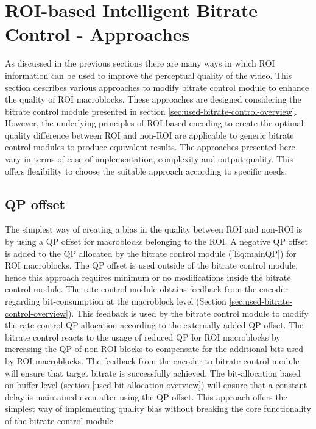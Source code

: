\documentclass[11pt]{article} %
\begin{document}
\section{ROI-based Intelligent Bitrate Control - Approaches}
As discussed in the previous sections there are many ways in which ROI information can be used to improve the perceptual quality of the video. This section describes various approaches to modify bitrate control module to enhance the quality of ROI macroblocks. These approaches are designed considering the bitrate control module presented in section \ref{sec:used-bitrate-control-overview}. However, the underlying principles of ROI-based encoding to create the optimal quality difference between ROI and non-ROI are applicable to generic bitrate control modules to produce equivalent results. The approaches presented here vary in terms of ease of implementation, complexity and output quality. This offers flexibility to choose the suitable approach according to specific needs.

\subsection{QP offset}
The simplest way of creating a bias in the quality between ROI and non-ROI is by using a QP offset for macroblocks belonging to the ROI. A negative QP offset is added to the QP allocated by the bitrate control module (\ref{Eq:mainQP}) for ROI macroblocks. The QP offset is used outside of the bitrate control module, hence this approach requires minimum or no modifications inside the bitrate control module. The rate control module obtains feedback from the encoder regarding bit-consumption at the macroblock level (Section \ref{sec:used-bitrate-control-overview}). This feedback is used by the bitrate control module to modify the rate control QP allocation according to the externally added QP offset. The bitrate control reacts to the usage of reduced QP for ROI macroblocks by increasing the QP of non-ROI blocks to compensate for the additional bits used by ROI macroblocks. The feedback from the encoder to bitrate control module will ensure that target bitrate is successfully achieved. The bit-allocation based on buffer level (section \ref{used-bit-allocation-overview}) will ensure that a constant delay is maintained even after using the QP offset. This approach offers the simplest way of implementing quality bias without breaking the core functionality of the bitrate control module.  
\end{document}

